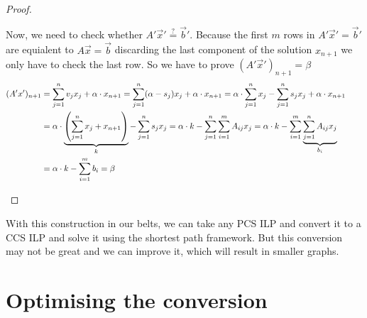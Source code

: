 \begin{proof}
\begin{itemize}
        Now, we need to check whether $A'\vec x'\stackrel{?}{=}\vec b'$. Because the first $m$ rows in $A'\vec x'=\vec b'$ are equialent to $A\vec x=\vec b$ discarding the last component of the solution $x_{n+1}$ we only have to check the last row. So we have to prove $(A'\vec x')_{n+1} = \beta$
        \begin{align*}
            (A'x')_{n+1} &= \sum_{j=1}^{n}v_jx_j + \alpha \cdot x_{n+1} = \sum_{j=1}^{n}(\alpha - s_j)x_j + \alpha \cdot x_{n+1} = \alpha \cdot \sum_{j=1}^{n}x_j - \sum_{j=1}^{n}s_jx_j + \alpha \cdot x_{n+1}\\
            &= \alpha \cdot \underbrace{\left(\sum_{j=1}^{n}x_j + x_{n+1}\right)}_k - \sum_{j=1}^{n}s_jx_j = \alpha \cdot k - \sum_{j=1}^{n}\sum_{i=1}^{m}A_{ij}x_j = \alpha\cdot k - \sum_{i=1}^{m}\underbrace{\sum_{j=1}^{n}A_{ij}x_j}_{b_i}\\
            &= \alpha\cdot k - \sum_{i=1}^{m}b_i = \beta &&\qedhere
        \end{align*}
    \end{itemize}
\end{proof}
With this construction in our belts, we can take any PCS ILP and convert it to a CCS ILP and solve it using the shortest path framework. But this conversion may not be great and we can improve it, which will result in smaller graphs.

\section{Optimising the conversion}
